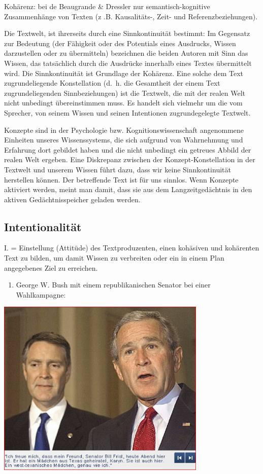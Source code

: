 \documentclass[
  letterpaper,
]{scrbook}
\providecommand{\tightlist}{%
  \setlength{\itemsep}{0pt}\setlength{\parskip}{0pt}}\usepackage{longtable,booktabs,array}
\begin{document}
Kohärenz: bei de Beaugrande \& Dressler nur semantisch-kognitive
Zusammenhänge von Texten (z .B. Kausalitäts-, Zeit- und
Referenzbeziehungen).

Die Textwelt, ist ihrerseits durch eine Sinnkontinuität bestimmt: Im
Gegensatz zur Bedeutung (der Fähigkeit oder des Potentials eines
Ausdrucks, Wissen darzustellen oder zu übermitteln) bezeichnen die
beiden Autoren mit Sinn das Wissen, das tatsächlich durch die Ausdrücke
innerhalb eines Textes übermittelt wird. Die Sinnkontinuität ist
Grundlage der Kohärenz. Eine solche dem Text zugrundeliegende
Konstellation (d.~h. die Gesamtheit der einem Text zugrundeliegenden
Sinnbeziehungen) ist die Textwelt, die mit der realen Welt nicht
unbedingt übereinstimmen muss. Es handelt sich vielmehr um die vom
Sprecher, von seinem Wissen und seinen Intentionen zugrundegelegte
Textwelt.

Konzepte sind in der Psychologie bzw. Kognitionswissenschaft angenommene
Einheiten unseres Wissenssystems, die sich aufgrund von Wahrnehmung und
Erfahrung dort gebildet haben und die nicht unbedingt ein getreues
Abbild der realen Welt ergeben. Eine Diskrepanz zwischen der
Konzept-Konstellation in der Textwelt und unserem Wissen führt dazu,
dass wir keine Sinnkontinuität herstellen können. Der betreffende Text
ist für uns sinnlos. Wenn Konzepte aktiviert werden, meint man damit,
dass sie aus dem Langzeitgedächtnis in den aktiven Gedächtnisspeicher
geladen werden.

\hypertarget{intentionalituxe4t}{%
\subsection{Intentionalität}\label{intentionalituxe4t}}

I. = Einstellung (Attitüde) des Textproduzenten, einen kohäsiven und
kohärenten Text zu bilden, um damit Wissen zu verbreiten oder ein in
einem Plan angegebenes Ziel zu erreichen.

\begin{enumerate}
\def\labelenumi{(\arabic{enumi})}
\setcounter{enumi}{10}
\tightlist
\item
  George W. Bush mit einem republikanischen Senator bei einer
  Wahlkampagne:
\end{enumerate}

\includegraphics[width=0.75\textwidth,height=\textheight]{./pictures/textkriterien_7.png}
\end{document}
